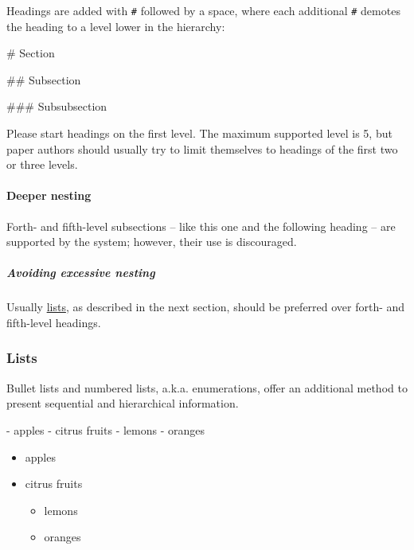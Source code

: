 \documentclass[10pt,a4paper,onecolumn]{article}
\newenvironment{Shaded}{}{}
\newcommand{\FunctionTok}[1]{\textcolor[rgb]{0.02,0.16,0.49}{#1}}
\newcommand{\NormalTok}[1]{#1}
\newcommand{\SpecialStringTok}[1]{\textcolor[rgb]{0.73,0.40,0.53}{#1}}
\providecommand{\tightlist}{%
  \setlength{\itemsep}{0pt}\setlength{\parskip}{0pt}}
\begin{document}
Headings are added with \texttt{\#} followed by a space, where each
additional \texttt{\#} demotes the heading to a level lower in the
hierarchy:

\begin{Shaded}
\begin{Highlighting}[]
\FunctionTok{\# Section}

\FunctionTok{\#\# Subsection}

\FunctionTok{\#\#\# Subsubsection}
\end{Highlighting}
\end{Shaded}

Please start headings on the first level. The maximum supported level is
5, but paper authors should usually try to limit themselves to headings
of the first two or three levels.

\paragraph{Deeper nesting}\label{deeper-nesting}

Forth- and fifth-level subsections -- like this one and the following
heading -- are supported by the system; however, their use is
discouraged.

\subparagraph{Avoiding excessive
nesting}\label{avoiding-excessive-nesting}

Usually \hyperref[lists]{lists}, as described in the next section,
should be preferred over forth- and fifth-level headings.

\subsubsection{Lists}\label{lists}

Bullet lists and numbered lists, a.k.a. enumerations, offer an
additional method to present sequential and hierarchical information.

\begin{Shaded}
\begin{Highlighting}[]
\SpecialStringTok{{-} }\NormalTok{apples}
\SpecialStringTok{{-} }\NormalTok{citrus fruits}
\SpecialStringTok{  {-} }\NormalTok{lemons}
\SpecialStringTok{  {-} }\NormalTok{oranges}
\end{Highlighting}
\end{Shaded}

\begin{itemize}
\tightlist
\item
  apples
\item
  citrus fruits

  \begin{itemize}
  \tightlist
  \item
    lemons
  \item
    oranges
  \end{itemize}
\end{itemize}
\end{document}
